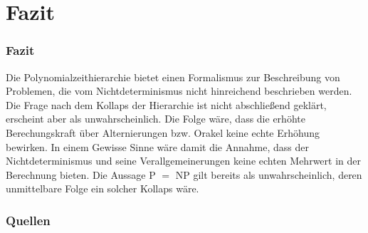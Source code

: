 \section{Fazit}

\begin{frame}
    \frametitle{Fazit}
    Die Polynomialzeithierarchie bietet einen Formalismus zur Beschreibung von Problemen, die vom Nichtdeterminismus nicht hinreichend beschrieben werden.
    Die Frage nach dem Kollaps der Hierarchie ist nicht abschließend geklärt, erscheint aber als unwahrscheinlich.
    Die Folge wäre, dass die erhöhte Berechungskraft über Alternierungen bzw. Orakel keine echte Erhöhung bewirken.
    In einem Gewisse Sinne wäre damit die Annahme, dass der Nichtdeterminismus und seine Verallgemeinerungen keine echten Mehrwert in der Berechnung bieten.
    Die Aussage P $=$ NP gilt bereits als unwahrscheinlich, deren unmittelbare Folge ein solcher Kollaps wäre.
\end{frame}


\begin{frame}[allowframebreaks]
\frametitle{Quellen}
\printbibliography[heading=none]

\end{frame}